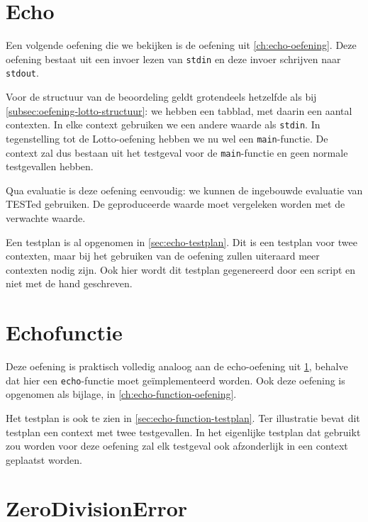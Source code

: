 \inputminted[firstline=6,lastline=50,gobble=8]{json}{sources/lotto-plan.tson}

\section{Echo}\label{sec:oefening-echo}

Een volgende oefening die we bekijken is de oefening uit \cref{ch:echo-oefening}.
Deze oefening bestaat uit een invoer lezen van \texttt{stdin} en deze invoer schrijven naar \texttt{stdout}.

Voor de structuur van de beoordeling geldt grotendeels hetzelfde als bij \cref{subsec:oefening-lotto-structuur}: we hebben een tabblad, met daarin een aantal contexten.
In elke context gebruiken we een andere waarde als \texttt{stdin}.
In tegenstelling tot de Lotto-oefening hebben we nu wel een \texttt{main}-functie.
De context zal dus bestaan uit het testgeval voor de \texttt{main}-functie en geen normale testgevallen hebben.

Qua evaluatie is deze oefening eenvoudig: we kunnen de ingebouwde evaluatie van TESTed gebruiken.
De geproduceerde waarde moet vergeleken worden met de verwachte waarde.

Een testplan is al opgenomen in \cref{sec:echo-testplan}.
Dit is een testplan voor twee contexten, maar bij het gebruiken van de oefening zullen uiteraard meer contexten nodig zijn.
Ook hier wordt dit testplan gegenereerd door een script en niet met de hand geschreven.

\section{Echofunctie}\label{sec:oefening-echofunctie}

Deze oefening is praktisch volledig analoog aan de echo-oefening uit \cref{sec:oefening-echo}, behalve dat hier een \texttt{echo}-functie moet geïmplementeerd worden.
Ook deze oefening is opgenomen als bijlage, in \cref{ch:echo-function-oefening}.

Het testplan is ook te zien in \cref{sec:echo-function-testplan}.
Ter illustratie bevat dit testplan een context met twee testgevallen.
In het eigenlijke testplan dat gebruikt zou worden voor deze oefening zal elk testgeval ook afzonderlijk in een context geplaatst worden.

\section{ZeroDivisionError}\label{sec:oefening-zero}

